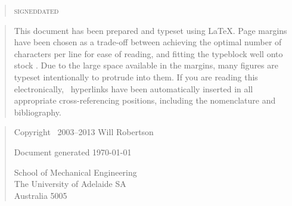 \begin{quote}
\hrulefill\hrulefill\hrulefill\hfill\hrulefill\hrulefill

\noindent\small\textsc{signed}\hfill\textsc{dated}
\end{quote}

\addvspace{0.75cm}
\begin{quote}
\nonfrenchspacing
\parfillskip=0pt
This document has been prepared and typeset using \LaTeX{}.
\PPP
Page margins have been chosen as a trade-off between achieving the optimal number of characters per line for ease of reading, and fitting the typeblock well onto  stock \cite{bringhurst-typestyle}.
Due to the large space available in the margins, many figures are typeset intentionally to protrude into them.
\PPP
If you are reading this electronically, \PDF\ hyperlinks have been automatically inserted in all appropriate cross-referencing positions, including the nomenclature and bibliography.
\end{quote}
\vfil
\begin{quote}
  \centering
  Copyright \textcopyright\ 2003--2013 Will Robertson

  \bigskip
  Document generated \today

  \bigskip
  School of Mechanical Engineering\\
  The University of Adelaide SA\\
  Australia 5005\\
\end{quote}
\null
\newpage

